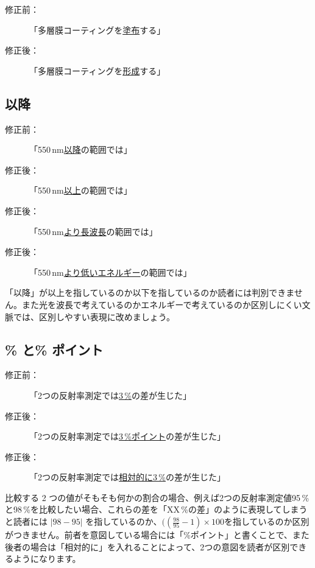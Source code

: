 \begin{description}
\item[修正前：]「多層膜コーティングを\underline{塗布}する」
\item[修正後：]「多層膜コーティングを\underline{形成}する」
\end{description}


\subsection{以降}

\begin{description}
\item[修正前：]「550\,nm\underline{以降}の範囲では」
\item[修正後：]「550\,nm\underline{以上}の範囲では」
\item[修正後：]「550\,nm\underline{より長波長}の範囲では」
\item[修正後：]「550\,nm\underline{より低いエネルギー}の範囲では」
\end{description}

「以降」が以上を指しているのか以下を指しているのか読者には判別できません。また光を波長で考えているのかエネルギーで考えているのか区別しにくい文脈では、区別しやすい表現に改めましょう。

\subsection{\% と\% ポイント}

\begin{description}
\item[修正前：]「2つの反射率測定では\underline{3\,\%}の差が生じた」
\item[修正後：]「2つの反射率測定では\underline{3\,\%ポイント}の差が生じた」
\item[修正後：]「2つの反射率測定では\underline{相対的に3\,\%}の差が生じた」
\end{description}

比較する 2 つの値がそもそも何かの割合の場合、例えば2つの反射率測定値95\,\%と98\,\%を比較したい場合、これらの差を「XX\,\%の差」のように表現してしまうと読者には $|98-95|$ を指しているのか、$((\frac{98}{95} - 1)\times100$を指しているのか区別がつきません。前者を意図している場合には「\%ポイント」と書くことで、また後者の場合は「相対的に」を入れることによって、2つの意図を読者が区別できるようになります。

